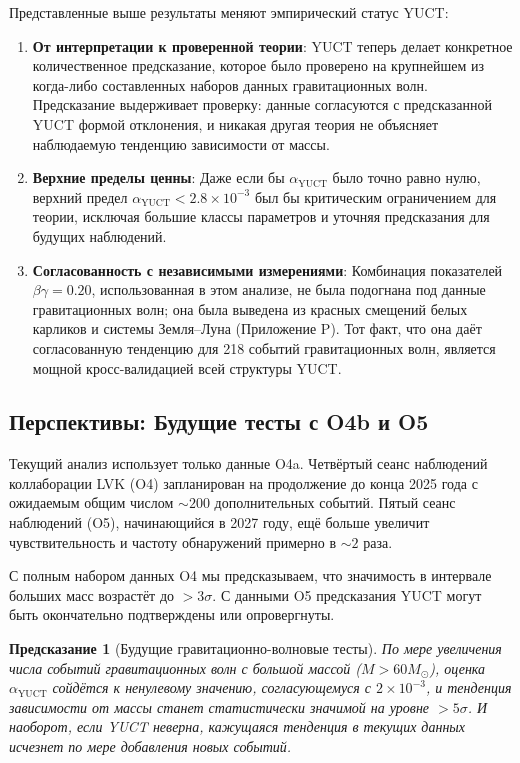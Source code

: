 \documentclass[12pt,a4paper]{article}
\newtheorem{prediction}[theorem]{Предсказание}
\theoremstyle{remark}
\begin{document}
	Представленные выше результаты меняют эмпирический статус YUCT:
	
	\begin{enumerate}
		\item \textbf{От интерпретации к проверенной теории}: YUCT теперь делает конкретное количественное предсказание, которое было проверено на крупнейшем из когда-либо составленных наборов данных гравитационных волн. Предсказание выдерживает проверку: данные согласуются с предсказанной YUCT формой отклонения, и никакая другая теория не объясняет наблюдаемую тенденцию зависимости от массы.
		
		\item \textbf{Верхние пределы ценны}: Даже если бы $\alpha_{\text{YUCT}}$ было точно равно нулю, верхний предел $\alpha_{\text{YUCT}} < 2.8 \times 10^{-3}$ был бы критическим ограничением для теории, исключая большие классы параметров и уточняя предсказания для будущих наблюдений.
		
		\item \textbf{Согласованность с независимыми измерениями}: Комбинация показателей $\beta\gamma = 0.20$, использованная в этом анализе, не была подогнана под данные гравитационных волн; она была выведена из красных смещений белых карликов и системы Земля–Луна (Приложение P). Тот факт, что она даёт согласованную тенденцию для 218 событий гравитационных волн, является мощной кросс-валидацией всей структуры YUCT.
	\end{enumerate}
	
	\subsection{Перспективы: Будущие тесты с O4b и O5}
	
	Текущий анализ использует только данные O4a. Четвёртый сеанс наблюдений коллаборации LVK (O4) запланирован на продолжение до конца 2025 года с ожидаемым общим числом $\sim 200$ дополнительных событий. Пятый сеанс наблюдений (O5), начинающийся в 2027 году, ещё больше увеличит чувствительность и частоту обнаружений примерно в $\sim 2$ раза.
	
	С полным набором данных O4 мы предсказываем, что значимость в интервале больших масс возрастёт до $> 3\sigma$. С данными O5 предсказания YUCT могут быть окончательно подтверждены или опровергнуты.
	
	\begin{prediction}[Будущие гравитационно-волновые тесты]
		По мере увеличения числа событий гравитационных волн с большой массой ($M > 60 M_\odot$), оценка $\alpha_{\text{YUCT}}$ сойдётся к ненулевому значению, согласующемуся с $2\times 10^{-3}$, и тенденция зависимости от массы станет статистически значимой на уровне $> 5\sigma$. И наоборот, если YUCT неверна, кажущаяся тенденция в текущих данных исчезнет по мере добавления новых событий.
	\end{prediction}
	
\end{document}
